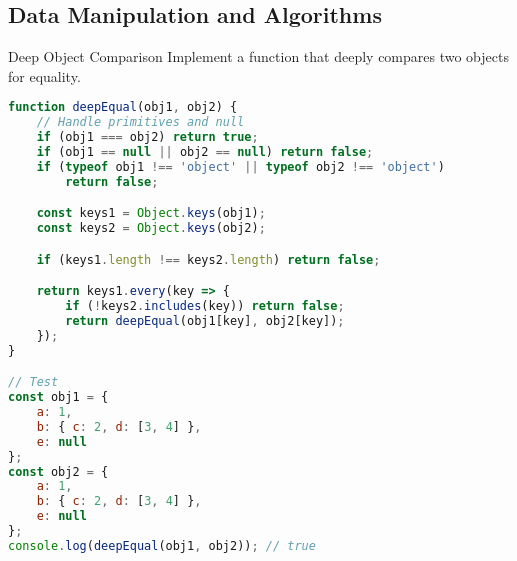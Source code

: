 \subsection{Data Manipulation and Algorithms}

\begin{example2}{Deep Object Comparison}
Implement a function that deeply compares two objects for equality.

\begin{lstlisting}[language=JavaScript, style=basesmol]
function deepEqual(obj1, obj2) {
    // Handle primitives and null
    if (obj1 === obj2) return true;
    if (obj1 == null || obj2 == null) return false;
    if (typeof obj1 !== 'object' || typeof obj2 !== 'object') 
        return false;

    const keys1 = Object.keys(obj1);
    const keys2 = Object.keys(obj2);

    if (keys1.length !== keys2.length) return false;

    return keys1.every(key => {
        if (!keys2.includes(key)) return false;
        return deepEqual(obj1[key], obj2[key]);
    });
}

// Test
const obj1 = {
    a: 1,
    b: { c: 2, d: [3, 4] },
    e: null
};
const obj2 = {
    a: 1,
    b: { c: 2, d: [3, 4] },
    e: null
};
console.log(deepEqual(obj1, obj2)); // true
\end{lstlisting}
\end{example2}

